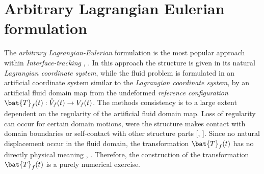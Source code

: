 \section{Arbitrary Lagrangian Eulerian formulation}
The \textit{arbitrary Lagrangian-Eulerian} formulation is the most popular approach within \textit{Interface-tracking} \cite{Richter2010a}, \cite{Frei2016}. In this approach the structure is given in its natural \textit{Lagrangian coordinate system}, while the fluid problem is formulated in an artificial coordinate system similar to the \textit{Lagrangian coordinate system}, by an artificial fluid domain map from the undeformed \textit{reference configuration} $\bat{T}_f (t): \hat{V}_f (t) \rightarrow V_f (t)$. The methods consistency is to a large extent dependent on the regularity of the artificial fluid domain map. Loss of regularity can occur for certain domain motions, were the structure makes contact with domain boundaries or self-contact with other structure parts  [\cite{Wriggers2006}, \cite{Richter2016}].  Since no natural displacement occur in the fluid domain, the transformation $\bat{T}_f (t)$ has no directly physical meaning \cite{Richter2010a}, \cite{Donea2004}. Therefore, the construction of the transformation $\bat{T}_f (t)$ is a purely numerical exercise.
\newpage
